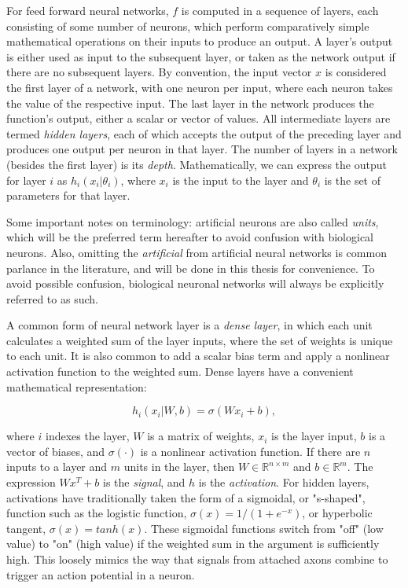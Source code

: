 For feed forward neural networks, $f$ is computed in a sequence of layers, each consisting of some number of neurons, which perform comparatively simple mathematical operations on their inputs to produce an output.
A layer's output is either used as input to the subsequent layer, or taken as the network output if there are no subsequent layers.
By convention, the input vector $x$ is considered the first layer of a network, with one neuron per input, where each neuron takes the value of the respective input.
The last layer in the network produces the function's output, either a scalar or vector of values.
All intermediate layers are termed \textit{hidden layers}, each of which accepts the output of the preceding layer and produces one output per neuron in that layer.
The number of layers in a network (besides the first layer) is its \textit{depth}.
Mathematically, we can express the output for layer $i$ as $h_i(x_i| \theta_i)$, where $x_i$ is the input to the layer and $\theta_i$ is the set of parameters for that layer.

Some important notes on terminology: artificial neurons are also called \textit{units}, which will be the preferred term hereafter to avoid confusion with biological neurons. Also, omitting the \textit{artificial} from artificial neural networks is common parlance in the literature, and will be done in this thesis for convenience. To avoid possible confusion, biological neuronal networks will always be explicitly referred to as such.

A common form of neural network layer is a \textit{dense layer}, in which each unit calculates a weighted sum of the layer inputs, where the set of weights is unique to each unit.
It is also common to add a scalar bias term and apply a nonlinear activation function to the weighted sum.
Dense layers have a convenient mathematical representation:

\begin{equation}
h_i(x_i|W, b)=\sigma(W x_i + b),
\label{eq:denselayer}
\end{equation}

\noindent
where $i$ indexes the layer, $W$ is a matrix of weights, $x_i$ is the layer input, $b$ is a vector of biases, and $\sigma(\cdot)$ is a nonlinear activation function.
If there are $n$ inputs to a layer and $m$ units in the layer, then $W\in\mathbb{R}^{n \times m}$ and $b\in\mathbb{R}^{m}$.
The expression $W x^T + b$ is the \textit{signal}, and $h$ is the \textit{activation}.
For hidden layers, activations have traditionally taken the form of a sigmoidal, or "s-shaped", function such as the logistic function, $\sigma(x) = 1/(1+e^{-x})$, or hyperbolic tangent, $\sigma(x) = tanh(x)$.
These sigmoidal functions switch from "off" (low value) to "on" (high value) if the weighted sum in the argument is sufficiently high.
This loosely mimics the way that signals from attached axons combine to trigger an action potential in a neuron.

